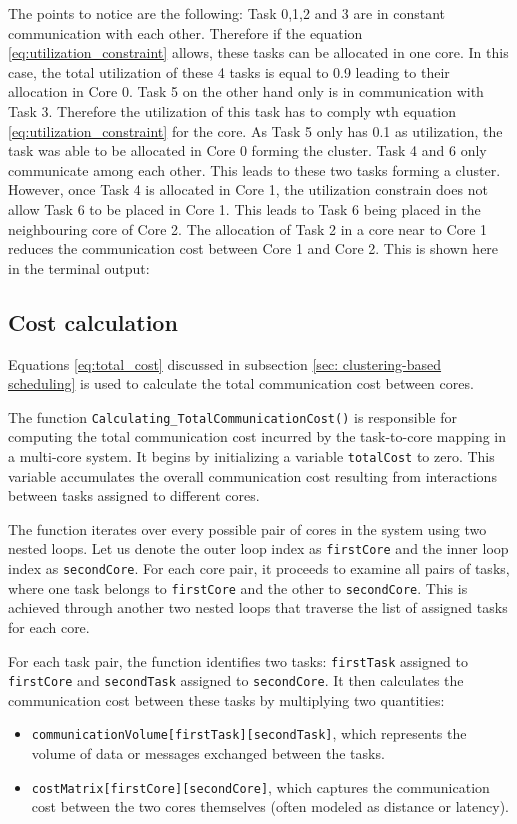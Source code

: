 \documentclass[conference]{IEEEtran}
\begin{document}
The points to notice are the following: Task 0,1,2 and 3 are in constant communication with each other. Therefore if the equation \ref{eq:utilization_constraint} allows, these tasks can be allocated in one core. In this case, the total utilization of these 4 tasks is equal to 0.9 leading to their allocation in Core 0. Task 5 on the other hand only is in communication with Task 3. Therefore the utilization of this task has to comply wth equation \ref{eq:utilization_constraint} for the core. As Task 5 only has 0.1 as utilization, the task was able to be allocated in Core 0 forming the cluster. Task 4 and 6 only communicate among each other. This leads to these two tasks forming a cluster. However, once Task 4 is allocated in Core 1, the utilization constrain does not allow Task 6 to be placed in Core 1. This leads to Task 6 being placed in the neighbouring core of Core 2. The allocation of Task 2 in a core near to Core 1 reduces the communication cost between Core 1 and Core 2.
 This is shown here in the terminal output:

\subsection{Cost calculation}
\label{subsec: cost calculation}
Equations \ref{eq:total_cost} discussed in subsection \ref{sec: clustering-based scheduling} is used to calculate the total communication cost between cores. 

The function \texttt{Calculating\_TotalCommunicationCost()} is responsible for computing the total communication cost incurred by the task-to-core mapping in a multi-core system. It begins by initializing a variable \texttt{totalCost} to zero. This variable accumulates the overall communication cost resulting from interactions between tasks assigned to different cores.

The function iterates over every possible pair of cores in the system using two nested loops. Let us denote the outer loop index as \texttt{firstCore} and the inner loop index as \texttt{secondCore}. For each core pair, it proceeds to examine all pairs of tasks, where one task belongs to \texttt{firstCore} and the other to \texttt{secondCore}. This is achieved through another two nested loops that traverse the list of assigned tasks for each core.

For each task pair, the function identifies two tasks: \texttt{firstTask} assigned to \texttt{firstCore} and \texttt{secondTask} assigned to \texttt{secondCore}. It then calculates the communication cost between these tasks by multiplying two quantities:
\begin{itemize}
    \item \texttt{communicationVolume[firstTask][secondTask]}, which represents the volume of data or messages exchanged between the tasks.
    \item \texttt{costMatrix[firstCore][secondCore]}, which captures the communication cost between the two cores themselves (often modeled as distance or latency).
\end{itemize}
\end{document}
